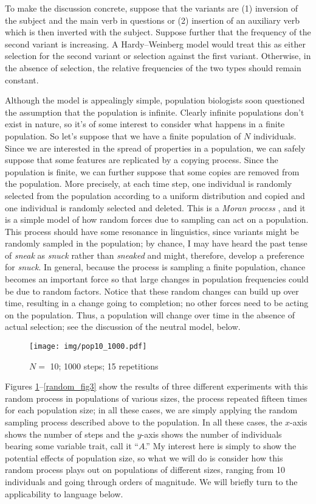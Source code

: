 \documentclass[output=paper]{langsci/langscibook}
\begin{document}
To make the discussion concrete, suppose that the variants are (1)
inversion of the subject and the main verb in questions or (2)
insertion of an auxiliary verb which is then inverted with the
subject.  Suppose further that the frequency of the second variant
is increasing.  A Hardy--Weinberg model would treat this as either
selection for the second variant or selection against the first
variant.  Otherwise, in the absence of selection, the relative
frequencies of the two types should remain constant.

Although the model is appealingly simple, population biologists soon
questioned the assumption that the population is infinite. Clearly
infinite populations don't exist in nature, so it's of some interest to
consider what happens in a finite population.  So let's suppose that
we have a finite population of $N$ individuals.  Since we are
interested in the spread of properties in a population, we can safely
suppose that some features are replicated by a copying process.  Since
the population is finite, we can further suppose that some copies are
removed from the population.  More precisely, at each time step, one
individual is randomly selected from the population according to a
uniform distribution and copied and one individual is randomly
selected and deleted.  This is a \emph{Moran process}
\citep{moran:1958}, and it is a simple model of how random forces due
to sampling can act on a population.  This process should have some
resonance in linguistics, since variants might be randomly sampled in
the population; by chance, I may have heard the past tense of
\emph{sneak} as \emph{snuck} rather than \emph{sneaked} and might,
therefore, develop a preference for \emph{snuck}.  In general, because
the process is sampling a finite population, chance becomes an
important force so that large changes in population frequencies could
be due to random factors.  Notice that these random changes can build
up over time, resulting in a change going to completion; no other
forces need to be acting on the population.  Thus, a population will
change over time in the absence of actual selection; see the
discussion of the neutral model, below.

\begin{figure}
  \texttt{[image: img/pop10\_1000.pdf]}
  \caption{$N=$ \num{10}; \num{1000} steps; 15 repetitions\label{random_fig1}}
\end{figure}

Figures \ref{random_fig1}--\ref{random_fig3} show the results of three
different experiments with this random process in populations of
various sizes, the process repeated fifteen times for each population
size; in all these cases, we are simply applying the random sampling
process described above to the population.  In all these cases, the
$x$-axis shows the number of steps and the $y$-axis shows the
number of individuals bearing some variable trait, call it
``$A$.''  My interest here is simply to show the potential effects of
population size, so what we will do is consider how this random
process plays out on populations of different sizes, ranging from 10
individuals and going through orders of magnitude.  We will briefly
turn to the applicability to language below.
\end{document}
